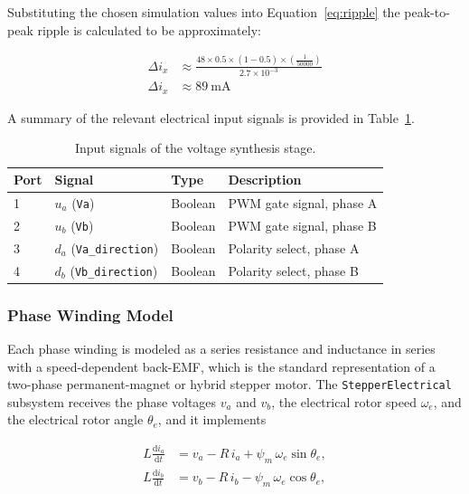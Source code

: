 Substituting the chosen simulation values into Equation~\eqref{eq:ripple} the peak-to-peak ripple is calculated to be approximately: 

\begin{equation}
	\begin{aligned}
		\Delta i_x &\approx \frac{48\times0.5\times(1-0.5)\times\left(\frac{1}{50000}\right)}{2.7\times10^{-3}} \\
		\Delta i_x &\approx \SI{89}{\milli\ampere}
	\end{aligned}
	\label{eq:rippleValue}
\end{equation}

A summary of the relevant electrical input signals is provided in Table~\ref{tab:interface}. 


\begin{table}[htbp]
	\centering
	\caption{Input signals of the voltage synthesis stage.}
	\label{tab:interface}
	\begin{tabular}{@{}llll@{}}
		\toprule
		Port & Signal & Type & Description \\
		\midrule
		1 & $u_a$ (\texttt{Va}) & Boolean & PWM gate signal, phase A \\
		2 & $u_b$ (\texttt{Vb}) & Boolean & PWM gate signal, phase B \\
		3 & $d_a$ (\texttt{Va\_direction}) & Boolean & Polarity select, phase A \\
		4 & $d_b$ (\texttt{Vb\_direction}) & Boolean & Polarity select, phase B \\
		\bottomrule
	\end{tabular}
\end{table}


\subsubsection{Phase Winding Model}\label{sec:phase}


Each phase winding is modeled as a series resistance and inductance in series with a speed-dependent back-EMF, which is the standard representation of a two-phase permanent-magnet or hybrid stepper motor\cite{henke_modeling_2013,derammelaere_linear_2010,bernardi_performance_2022}. The \texttt{StepperElectrical} subsystem receives the phase voltages $v_a$ and $v_b$, the electrical rotor speed $\omega_e$, and the electrical rotor angle $\theta_e$, and it implements

\begin{align}
	L \frac{\mathrm{d} i_a}{\mathrm{d} t} &= v_a - R \, i_a + \psi_m \, \omega_e \sin\theta_e , \label{eq:ia} \\
	L \frac{\mathrm{d} i_b}{\mathrm{d} t} &= v_b - R \, i_b - \psi_m \, \omega_e \cos\theta_e , \label{eq:ib}
\end{align}


